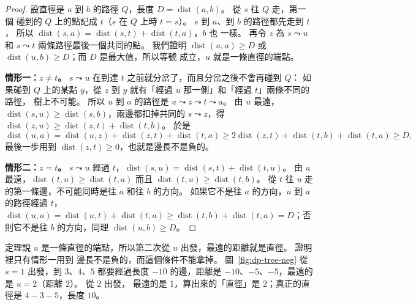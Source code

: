 \begin{proof}
設直徑是 $a$ 到 $b$ 的路徑 $Q$，長度 $D = \operatorname{dist}(a, b)$。 從 $s$ 往 $Q$ 走，第一個
碰到的 $Q$ 上的點記成 $t$（$s$ 在 $Q$ 上時 $t = s$）。 $s$ 到 $a$、到 $b$ 的路徑都先走到 $t$，
所以 $\operatorname{dist}(s, a) = \operatorname{dist}(s, t) + \operatorname{dist}(t, a)$，$b$ 也
一樣。 再令 $z$ 為 $s \leadsto u$ 和 $s \leadsto t$ 兩條路徑最後一個共同的點。 我們證明
$\operatorname{dist}(u, a) \ge D$ 或 $\operatorname{dist}(u, b) \ge D$；而 $D$ 是最大值，所以等號
成立，$u$ 就是一條直徑的端點。

\textbf{情形一：$z \ne t$。} $s \leadsto u$ 在到達 $t$ 之前就分岔了，而且分岔之後不會再碰到 $Q$：
如果碰到 $Q$ 上的某點 $y$，從 $z$ 到 $y$ 就有「經過 $u$ 那一側」和「經過 $t$」兩條不同的路徑，
樹上不可能。 所以 $u$ 到 $a$ 的路徑是 $u \leadsto z \leadsto t \leadsto a$。 由 $u$ 最遠，
$\operatorname{dist}(s, u) \ge \operatorname{dist}(s, b)$，兩邊都扣掉共同的 $s \leadsto z$，得
$\operatorname{dist}(z, u) \ge \operatorname{dist}(z, t) + \operatorname{dist}(t, b)$。 於是
\[
\operatorname{dist}(u, a) = \operatorname{dist}(u, z) + \operatorname{dist}(z, t) + \operatorname{dist}(t, a)
\ge 2\operatorname{dist}(z, t) + \operatorname{dist}(t, b) + \operatorname{dist}(t, a) \ge D ,
\]
最後一步用到 $\operatorname{dist}(z, t) \ge 0$，也就是邊長不是負的。

\textbf{情形二：$z = t$。} $s \leadsto u$ 經過 $t$，$\operatorname{dist}(s, u) =
\operatorname{dist}(s, t) + \operatorname{dist}(t, u)$。 由 $u$ 最遠，$\operatorname{dist}(t, u) \ge
\operatorname{dist}(t, a)$ 而且 $\operatorname{dist}(t, u) \ge \operatorname{dist}(t, b)$。 從 $t$
往 $u$ 走的第一條邊，不可能同時是往 $a$ 和往 $b$ 的方向。 如果它不是往 $a$ 的方向，$u$ 到 $a$
的路徑經過 $t$，$\operatorname{dist}(u, a) = \operatorname{dist}(u, t) + \operatorname{dist}(t, a)
\ge \operatorname{dist}(t, b) + \operatorname{dist}(t, a) = D$；否則它不是往 $b$ 的方向，同理
$\operatorname{dist}(u, b) \ge D$。
\end{proof}

定理說 $u$ 是一條直徑的端點，所以第二次從 $u$ 出發，最遠的距離就是直徑。 證明裡只有情形一用到
邊長不是負的，而這個條件不能拿掉。 圖~\ref{fig:dp-tree-neg} 從 $s = 1$ 出發，到 $3$、$4$、$5$
都要經過長度 $-10$ 的邊，距離是 $-10$、$-5$、$-5$，最遠的是 $u = 2$（距離 $2$）。 從 $2$ 出發，
最遠的是 $1$，算出來的「直徑」是 $2$；真正的直徑是 $4 - 3 - 5$，長度 $10$。

